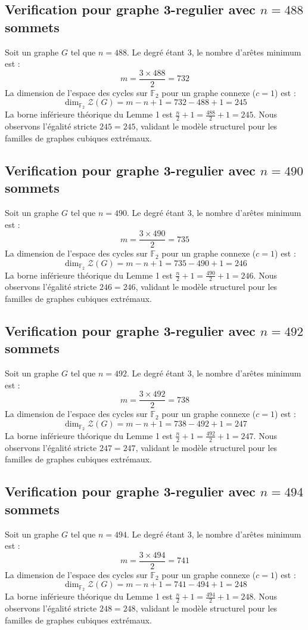 \documentclass[11pt,a4paper]{article}
\begin{document}
\subsection{Verification pour graphe 3-regulier avec $n=488$ sommets}
Soit un graphe $G$ tel que $n = 488$. Le degré étant 3, le nombre d'arêtes minimum est :
$$ m = \frac{3 \times 488}{2} = 732 $$
La dimension de l'espace des cycles sur $\mathbb{F}_2$ pour un graphe connexe ($c=1$) est :
$$ \dim_{\mathbb{F}_2} \mathcal{Z}(G) = m - n + 1 = 732 - 488 + 1 = 245 $$
La borne inférieure théorique du Lemme 1 est $\frac{n}{2} + 1 = \frac{488}{2} + 1 = 245$.
Nous observons l'égalité stricte $245 = 245$, validant le modèle structurel pour les familles de graphes cubiques extrémaux.

\subsection{Verification pour graphe 3-regulier avec $n=490$ sommets}
Soit un graphe $G$ tel que $n = 490$. Le degré étant 3, le nombre d'arêtes minimum est :
$$ m = \frac{3 \times 490}{2} = 735 $$
La dimension de l'espace des cycles sur $\mathbb{F}_2$ pour un graphe connexe ($c=1$) est :
$$ \dim_{\mathbb{F}_2} \mathcal{Z}(G) = m - n + 1 = 735 - 490 + 1 = 246 $$
La borne inférieure théorique du Lemme 1 est $\frac{n}{2} + 1 = \frac{490}{2} + 1 = 246$.
Nous observons l'égalité stricte $246 = 246$, validant le modèle structurel pour les familles de graphes cubiques extrémaux.

\subsection{Verification pour graphe 3-regulier avec $n=492$ sommets}
Soit un graphe $G$ tel que $n = 492$. Le degré étant 3, le nombre d'arêtes minimum est :
$$ m = \frac{3 \times 492}{2} = 738 $$
La dimension de l'espace des cycles sur $\mathbb{F}_2$ pour un graphe connexe ($c=1$) est :
$$ \dim_{\mathbb{F}_2} \mathcal{Z}(G) = m - n + 1 = 738 - 492 + 1 = 247 $$
La borne inférieure théorique du Lemme 1 est $\frac{n}{2} + 1 = \frac{492}{2} + 1 = 247$.
Nous observons l'égalité stricte $247 = 247$, validant le modèle structurel pour les familles de graphes cubiques extrémaux.

\subsection{Verification pour graphe 3-regulier avec $n=494$ sommets}
Soit un graphe $G$ tel que $n = 494$. Le degré étant 3, le nombre d'arêtes minimum est :
$$ m = \frac{3 \times 494}{2} = 741 $$
La dimension de l'espace des cycles sur $\mathbb{F}_2$ pour un graphe connexe ($c=1$) est :
$$ \dim_{\mathbb{F}_2} \mathcal{Z}(G) = m - n + 1 = 741 - 494 + 1 = 248 $$
La borne inférieure théorique du Lemme 1 est $\frac{n}{2} + 1 = \frac{494}{2} + 1 = 248$.
Nous observons l'égalité stricte $248 = 248$, validant le modèle structurel pour les familles de graphes cubiques extrémaux.
\end{document}
